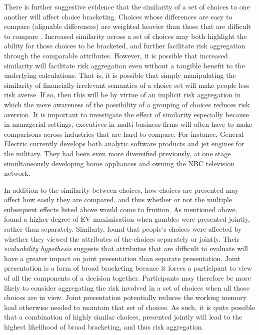 \documentclass[a4paper, nobind, dvipsnames]{templates/ociamthesis}
\theoremstyle{definition}
\theoremstyle{definition}
\theoremstyle{definition}
\theoremstyle{definition}
\theoremstyle{remark}
\begin{document}
There is further suggestive evidence that the similarity of a set of choices to
one another will affect choice bracketing. Choices whose differences are easy to
compare (alignable differences) are weighted heavier than those that are
difficult to compare \autocite{markman1995,markman2010}. Increased similarity across a
set of choices may both highlight the ability for those choices to be bracketed,
and further facilitate risk aggregation through the comparable attributes.
However, it is possible that increased similarity will facilitate risk
aggregation even without a tangible benefit to the underlying calculations. That
is, it is possible that simply manipulating the similarity of
financially-irrelevant semantics of a choice set will make people less risk
averse. If so, then this will be by virtue of an implicit risk aggregation in
which the mere awareness of the possibility of a grouping of choices reduces
risk aversion. It is important to investigate the effect of similarity
especially because in managerial settings, executives in multi-business firms
will often have to make comparisons across industries that are hard to compare.
For instance, General Electric currently develops both analytic software
products and jet engines for the military. They had been even more diversified
previously, at one stage simultaneously developing home appliances and owning
the NBC television network.

In addition to the similarity between choices, how choices are presented may
affect how easily they are compared, and thus whether or not the multiple
subsequent effects listed above would come to fruition. As mentioned above,
\textcite{haisley2008} found a higher degree of EV maximisation when gambles were
presented jointly, rather than separately. Similarly, \textcite{hsee1999} found that
people's choices were affected by whether they viewed the attributes of the
choices separately or jointly. Their \emph{evaluability hypothesis} suggests that
attributes that are difficult to evaluate will have a greater impact on joint
presentation than separate presentation. Joint presentation is a form of broad
bracketing because it forces a participant to view of all the components of a
decision together. Participants may therefore be more likely to consider
aggregating the risk involved in a set of choices when all those choices are in
view. Joint presentation potentially reduces the working memory load otherwise
needed to maintain that set of choices. As such, it is quite possible that a
combination of highly similar choices, presented jointly will lead to the
highest likelihood of broad bracketing, and thus risk aggregation.
\end{document}
